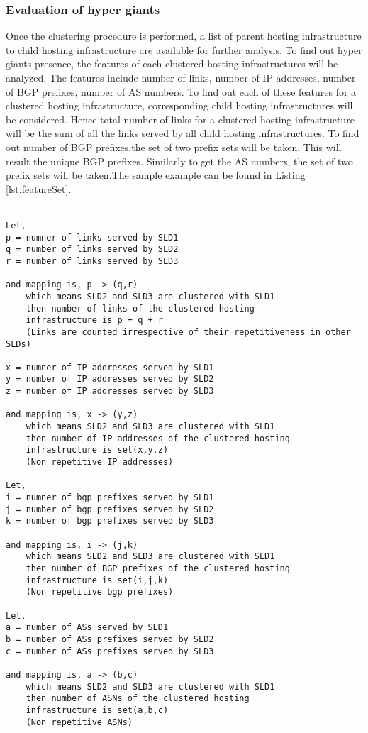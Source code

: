 \subsubsection{Evaluation of hyper giants}
\noindent Once the clustering procedure is performed, a list of parent hosting infrastructure to child hosting infrastructure are available for further analysis. To find out hyper giants presence, the features of each clustered hosting infrastructures will be analyzed. The features include number of links, number of IP addresses, number of BGP prefixes, number of AS numbers. To find out each of these features for a  clustered hosting infrastructure, corresponding child hosting infrastructures  will be considered. Hence total number of links for a clustered hosting infrastructure will be the sum of all the links served by all child hosting infrastructures. To find out number of BGP prefixes,the set of two prefix sets will be taken. This will result the unique BGP prefixes. Similarly to get the AS numbers, the set of two prefix sets will be taken.The sample example can be found in Listing \ref{lst:featureSet}.\\\\
\clearpage
\begin{lstlisting}[caption= Sample example to generate feature set , label=lst:featureSet]
Let,
p = numner of links served by SLD1
q = number of links served by SLD2
r = number of links served by SLD3

and mapping is, p -> (q,r) 
	which means SLD2 and SLD3 are clustered with SLD1
	then number of links of the clustered hosting 
	infrastructure is p + q + r 
	(Links are counted irrespective of their repetitiveness in other SLDs) 
	
x = numner of IP addresses served by SLD1
y = number of IP addresses served by SLD2
z = number of IP addresses served by SLD3

and mapping is, x -> (y,z) 
	which means SLD2 and SLD3 are clustered with SLD1
	then number of IP addresses of the clustered hosting 
	infrastructure is set(x,y,z) 
	(Non repetitive IP addresses)
		
Let,
i = numner of bgp prefixes served by SLD1
j = number of bgp prefixes served by SLD2
k = number of bgp prefixes served by SLD3

and mapping is, i -> (j,k) 
	which means SLD2 and SLD3 are clustered with SLD1
	then number of BGP prefixes of the clustered hosting
	infrastructure is set(i,j,k) 
	(Non repetitive bgp prefixes)
	
Let,
a = number of ASs served by SLD1
b = number of ASs prefixes served by SLD2
c = number of ASs prefixes served by SLD3

and mapping is, a -> (b,c) 
	which means SLD2 and SLD3 are clustered with SLD1
	then number of ASNs of the clustered hosting 
	infrastructure is set(a,b,c) 
	(Non repetitive ASNs)
\end{lstlisting}

